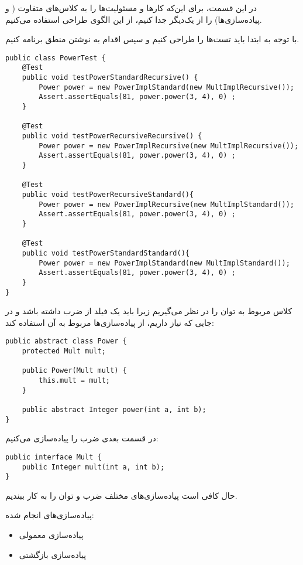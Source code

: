 \newpage
{}

در این قسمت، برای این‌که کارها و مسئولیت‌ها را به کلاس‌های متفاوت ( و پیاده‌سازی‌ها) را از یک‌دیگر جدا کنیم، از این الگوی طراحی استفاده می‌کنیم.

با توجه به  ابتدا باید تست‌ها را طراحی کنیم و سپس اقدام به نوشتن منطق برنامه کنیم.

\begin{Verbatim}[tabsize=4]
public class PowerTest {
	@Test
	public void testPowerStandardRecursive() {
		Power power = new PowerImplStandard(new MultImplRecursive());
		Assert.assertEquals(81, power.power(3, 4), 0) ;
	}
	
	@Test
	public void testPowerRecursiveRecursive() {
		Power power = new PowerImplRecursive(new MultImplRecursive());
		Assert.assertEquals(81, power.power(3, 4), 0) ;
	}
	
	@Test
	public void testPowerRecursiveStandard(){
		Power power = new PowerImplRecursive(new MultImplStandard());
		Assert.assertEquals(81, power.power(3, 4), 0) ;
	}
	
	@Test
	public void testPowerStandardStandard(){
		Power power = new PowerImplStandard(new MultImplStandard());
		Assert.assertEquals(81, power.power(3, 4), 0) ;
	}
}

\end{Verbatim}

کلاس مربوط به توان را  در نظر می‌گیریم زیرا باید یک فیلد از  ضرب داشته باشد و در جایی که نیاز داریم، از پیاده‌سازی‌ها مربوط به آن استفاده کند:

\begin{Verbatim}[tabsize=4]
public abstract class Power {
	protected Mult mult;
	
	public Power(Mult mult) {
		this.mult = mult;
	}
	
	public abstract Integer power(int a, int b);
}

\end{Verbatim}

در قسمت بعدی  ضرب را پیاده‌سازی می‌کنیم:

\begin{Verbatim}[tabsize=4]
public interface Mult {
	public Integer mult(int a, int b);
}
\end{Verbatim}

حال کافی است پیاده‌سازی‌های مختلف ضرب و توان را به کار ببندیم.

پیاده‌سازی‌های انجام شده:
\begin{itemize}
	\item پیاده‌سازی معمولی
	\item پیاده‌سازی بازگشتی
\end{itemize}

